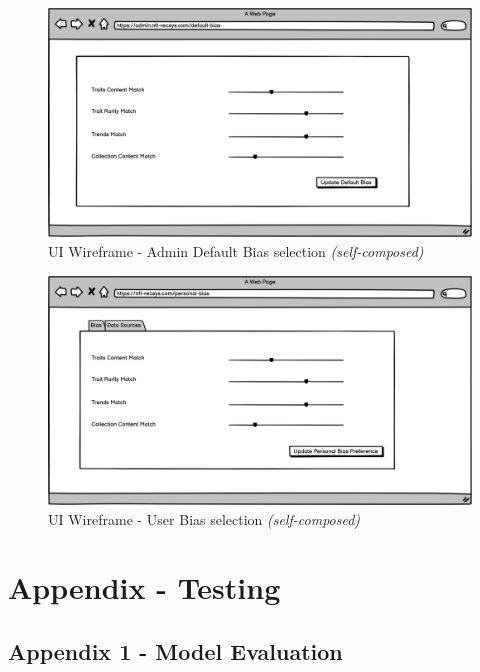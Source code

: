 \begin{figure}[h!]
\centering
\includegraphics[width=\textwidth]{images/appendix/UI Wireframes/Admin Default Bias selection.png}
\caption{UI Wireframe - Admin Default Bias selection \textit{(self-composed)}}
\end{figure}

\begin{figure}[h!]
\centering
\includegraphics[width=\textwidth]{images/appendix/UI Wireframes/User Bias selection.png}
\caption{UI Wireframe - User Bias selection \textit{(self-composed)}}
\end{figure}


\chapter{Appendix  - Testing}
\label{appendix:testing}

\section*{Appendix 1 - Model Evaluation}

